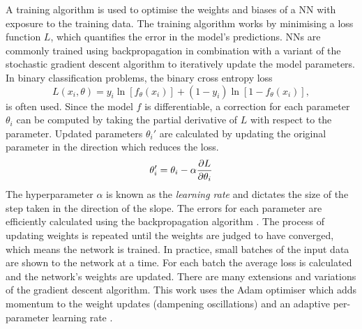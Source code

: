 A training algorithm is used to optimise the weights and biases of a NN with exposure to the training data.
The training algorithm works by minimising a loss function $L$, which quantifies the error in the model's predictions.
NNs are commonly trained using backpropagation in combination with a variant of the stochastic gradient descent algorithm to iteratively update the model parameters.
In binary classification problems, the binary cross entropy loss
%
\begin{equation}\label{eq:bce_loss}
  L(x_i, \theta) = y_i \ln[f_\theta(x_i)] + (1 - y_i) \ln[1 - f_\theta(x_i)],
\end{equation}
%
is often used. Since the model $f$ is differentiable, a correction for each parameter $\theta_i$ can be computed by taking the partial derivative of $L$ with respect to the parameter.
Updated parameters $\theta_i'$ are calculated by updating the original parameter in the direction which reduces the loss.
%
\begin{equation}\label{eq:weight_update}
  \theta_i' = \theta_i - \alpha \frac{\partial {L}}{\partial \theta_i}
\end{equation}
%
The hyperparameter $\alpha$ is known as the \textit{learning rate} and dictates the size of the step taken in the direction of the slope. 
The errors for each parameter are efficiently calculated using the backpropagation algorithm \cite{rumelhart1986learning}.
The process of updating weights is repeated until the weights are judged to have converged, which means the network is trained.
In practice, small batches of the input data are shown to the network at a time. For each batch the average loss is calculated and the network's weights are updated.
There are many extensions and variations of the gradient descent algorithm.
This work uses the Adam optimiser which adds momentum to the weight updates (dampening oscillations) and an adaptive per-parameter learning rate \cite{2014arXiv1412.6980K}.

